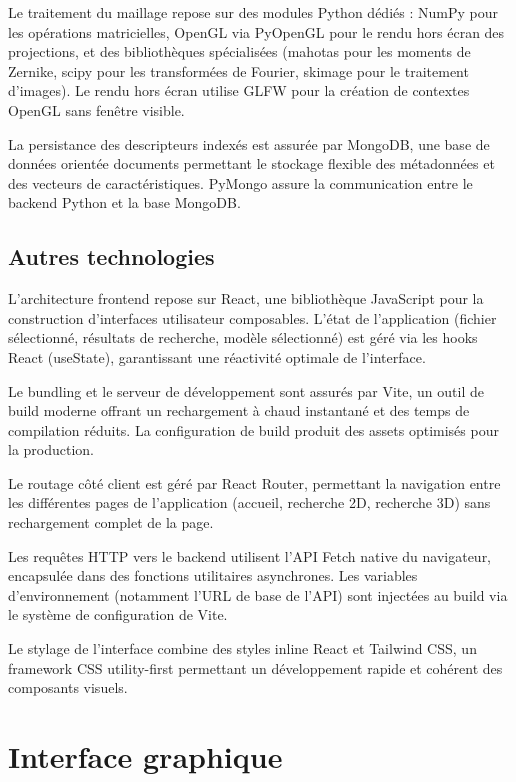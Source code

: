\documentclass[11pt,a4paper,oneside]{report}
\begin{document}
Le traitement du maillage repose sur des modules Python dédiés : NumPy pour les opérations matricielles, OpenGL via PyOpenGL pour le rendu hors écran des projections, et des bibliothèques spécialisées (mahotas pour les moments de Zernike, scipy pour les transformées de Fourier, skimage pour le traitement d'images). Le rendu hors écran utilise GLFW pour la création de contextes OpenGL sans fenêtre visible.

La persistance des descripteurs indexés est assurée par MongoDB, une base de données orientée documents permettant le stockage flexible des métadonnées et des vecteurs de caractéristiques. PyMongo assure la communication entre le backend Python et la base MongoDB.

\subsection{Autres technologies}

L'architecture frontend repose sur React, une bibliothèque JavaScript pour la construction d'interfaces utilisateur composables. L'état de l'application (fichier sélectionné, résultats de recherche, modèle sélectionné) est géré via les hooks React (useState), garantissant une réactivité optimale de l'interface.

Le bundling et le serveur de développement sont assurés par Vite, un outil de build moderne offrant un rechargement à chaud instantané et des temps de compilation réduits. La configuration de build produit des assets optimisés pour la production.

Le routage côté client est géré par React Router, permettant la navigation entre les différentes pages de l'application (accueil, recherche 2D, recherche 3D) sans rechargement complet de la page.

Les requêtes HTTP vers le backend utilisent l'API Fetch native du navigateur, encapsulée dans des fonctions utilitaires asynchrones. Les variables d'environnement (notamment l'URL de base de l'API) sont injectées au build via le système de configuration de Vite.

Le stylage de l'interface combine des styles inline React et Tailwind CSS, un framework CSS utility-first permettant un développement rapide et cohérent des composants visuels.

\section{Interface graphique}
\end{document}
